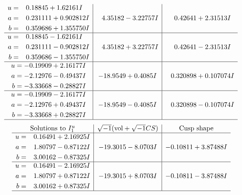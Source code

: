 \documentclass[1p]{elsarticle_modified}
\theoremstyle{definition}
\newcommand{\I}{\sqrt{-1}}
\begin{document}
$$\begin{array}{c|c|c}
\begin{aligned}
u &= \phantom{-}0.18845 + 1.62161 I \\
a &= \phantom{-}0.231111 + 0.902812 I \\
b &= \phantom{-}0.359686 + 1.355750 I\end{aligned}
 & \phantom{-}4.35182 - 3.22757 I & \phantom{-}0.42641 + 2.31513 I \\ \hline\begin{aligned}
u &= \phantom{-}0.18845 - 1.62161 I \\
a &= \phantom{-}0.231111 - 0.902812 I \\
b &= \phantom{-}0.359686 - 1.355750 I\end{aligned}
 & \phantom{-}4.35182 + 3.22757 I & \phantom{-}0.42641 - 2.31513 I \\ \hline\begin{aligned}
u &= -0.19909 + 2.16177 I \\
a &= -2.12976 - 0.49437 I \\
b &= -3.33668 - 0.28827 I\end{aligned}
 & -18.9549 + 0.4085 I & \phantom{-}0.320898 + 0.107074 I \\ \hline\begin{aligned}
u &= -0.19909 - 2.16177 I \\
a &= -2.12976 + 0.49437 I \\
b &= -3.33668 + 0.28827 I\end{aligned}
 & -18.9549 - 0.4085 I & \phantom{-}0.320898 - 0.107074 I\\
 \hline 
 \end{array}$$\newpage$$\begin{array}{c|c|c}  
\text{Solutions to }I^u_{1}& \I (\text{vol} + \sqrt{-1}CS) & \text{Cusp shape}\\
 \hline 
\begin{aligned}
u &= \phantom{-}0.16491 + 2.16925 I \\
a &= \phantom{-}1.80797 - 0.87122 I \\
b &= \phantom{-}3.00162 - 0.87325 I\end{aligned}
 & -19.3015 - 8.0703 I & -0.10811 + 3.87488 I \\ \hline\begin{aligned}
u &= \phantom{-}0.16491 - 2.16925 I \\
a &= \phantom{-}1.80797 + 0.87122 I \\
b &= \phantom{-}3.00162 + 0.87325 I\end{aligned}
 & -19.3015 + 8.0703 I & -0.10811 - 3.87488 I\\
 \hline 
 \end{array}$$\newpage\newpage\renewcommand{\arraystretch}{1}
\end{document}
